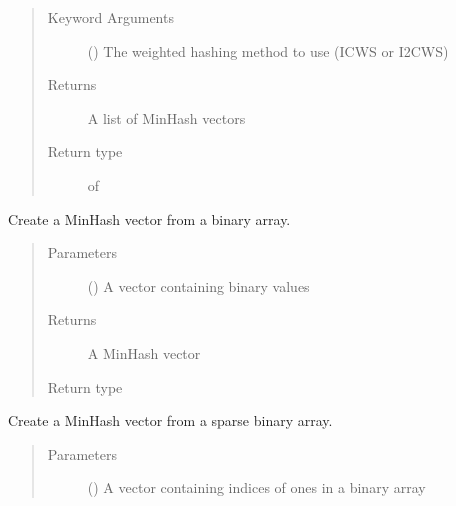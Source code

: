 \documentclass[letterpaper,10pt,english]{sphinxmanual}
\begin{document}
\begin{fulllineitems}
\begin{fulllineitems}
\begin{quote}
\begin{description}
\item[{Keyword Arguments}] \leavevmode
{} () \textendash{} The weighted hashing method to use (ICWS or I2CWS)

\item[{Returns}] \leavevmode
A list of MinHash vectors

\item[{Return type}] \leavevmode
{} of 

\end{description}\end{quote}

\end{fulllineitems}


\begin{fulllineitems}
\label{\detokenize{documentation:tmap.Minhash.from_binary_array}}
Create a MinHash vector from a binary array.
\begin{quote}\begin{description}
\item[{Parameters}] \leavevmode
{} () \textendash{} A vector containing binary values

\item[{Returns}] \leavevmode
A MinHash vector

\item[{Return type}] \leavevmode
{}

\end{description}\end{quote}

\end{fulllineitems}


\begin{fulllineitems}
\label{\detokenize{documentation:tmap.Minhash.from_sparse_binary_array}}
Create a MinHash vector from a sparse binary array.
\begin{quote}\begin{description}
\item[{Parameters}] \leavevmode
{} () \textendash{} A vector containing indices of ones in a binary array


\end{description}
\end{quote}
\end{fulllineitems}
\end{fulllineitems}
\end{document}
